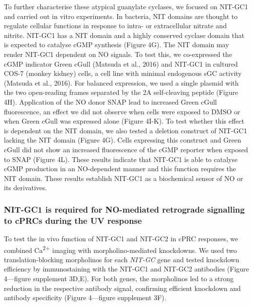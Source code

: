 \documentclass[
  11pt,
  letterpaper,
  DIV=11,
  numbers=noendperiod]{scrartcl}
\begin{document}
To further characterise these atypical guanylate cyclases, we focused on
NIT-GC1 and carried out in vitro experiments. In bacteria, NIT domains
are thought to regulate cellular functions in response to intra- or
extracellular nitrate and nitrite. NIT-GC1 has a NIT domain and a highly
conserved cyclase domain that is expected to catalyse cGMP synthesis
(Figure 4G). The NIT domain may render NIT-GC1 dependent on NO signals.
To test this, we co-expressed the cGMP indicator Green cGull (Matsuda et
al., 2016) and NIT-GC1 in cultured COS-7 (monkey kidney) cells, a cell
line with minimal endogenous sGC activity (Matsuda et al., 2016). For
balanced expression, we used a single plasmid with the two open-reading
frames separated by the 2A self-cleaving peptide (Figure 4H).
Application of the NO donor SNAP lead to increased Green cGull
fluorescence, an effect we did not observe when cells were exposed to
DMSO or when Green cGull was expressed alone (Figure 4I-K). To test
whether this effect is dependent on the NIT domain, we also tested a
deletion construct of NIT-GC1 lacking the NIT domain (Figure 4G). Cells
expressing this construct and Green cGull did not show an increased
fluorescence of the cGMP reporter when exposed to SNAP (Figure 4L).
These results indicate that NIT-GC1 is able to catalyse cGMP production
in an NO-dependent manner and this function requires the NIT domain.
These results establish NIT-GC1 as a biochemical sensor of NO or its
derivatives.

\subsubsection{NIT-GC1 is required for NO-mediated retrograde signalling
to cPRCs during the UV
response}\label{nit-gc1-is-required-for-no-mediated-retrograde-signalling-to-cprcs-during-the-uv-response}

To test the in vivo function of NIT-GC1 and NIT-GC2 in cPRC responses,
we combined Ca\textsuperscript{2+} imaging with morpholino-mediated
knockdowns. We used two translation-blocking morpholinos for each
\emph{NIT-GC} gene and tested knockdown efficiency by immunostaining
with the NIT-GC1 and NIT-GC2 antibodies (Figure 4---figure supplement
3D,E). For both genes, the morpholinos led to a strong reduction in the
respective antibody signal, confirming efficient knockdown and antibody
specificity (Figure 4---figure supplement 3F).
\end{document}
